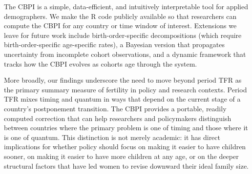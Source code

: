 \documentclass[12pt]{article}
\begin{document}
The CBPI is a simple, data-efficient, and intuitively interpretable
tool for applied demographers.  We make the R code publicly available
so that researchers can compute the CBPI for any country or time
window of interest.  Extensions we leave for future work include
birth-order-specific decompositions (which require birth-order-specific
age-specific rates), a Bayesian version that propagates uncertainty
from incomplete cohort observations, and a dynamic framework that
tracks how the CBPI evolves as cohorts age through the system.

More broadly, our findings underscore the need to move beyond period TFR
as the primary summary measure of fertility in policy and research
contexts.  Period TFR mixes timing and quantum in ways that depend on
the current stage of a country's postponement transition.  The
CBPI provides a portable, readily computed correction that can help
researchers and policymakers distinguish between countries where the
primary problem is one of timing and those where it is one of quantum.
This distinction is not merely academic: it has direct implications for
whether policy should focus on making it easier to have children sooner,
on making it easier to have more children at any age, or on the deeper
structural factors that have led women to revise downward their ideal
family size.



\clearpage
\end{document}
